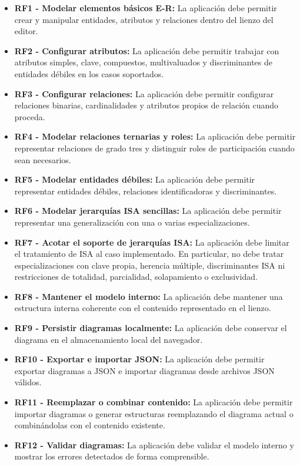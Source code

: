 \begin{itemize}
\tightlist
\item \textbf{RF1 - Modelar elementos básicos E-R:} La aplicación debe permitir crear y manipular entidades, atributos y relaciones dentro del lienzo del editor.
\item \textbf{RF2 - Configurar atributos:} La aplicación debe permitir trabajar con atributos simples, clave, compuestos, multivaluados y discriminantes de entidades débiles en los casos soportados.
\item \textbf{RF3 - Configurar relaciones:} La aplicación debe permitir configurar relaciones binarias, cardinalidades y atributos propios de relación cuando proceda.
\item \textbf{RF4 - Modelar relaciones ternarias y roles:} La aplicación debe permitir representar relaciones de grado tres y distinguir roles de participación cuando sean necesarios.
\item \textbf{RF5 - Modelar entidades débiles:} La aplicación debe permitir representar entidades débiles, relaciones identificadoras y discriminantes.
\item \textbf{RF6 - Modelar jerarquías ISA sencillas:} La aplicación debe permitir representar una generalización con una o varias especializaciones.
\item \textbf{RF7 - Acotar el soporte de jerarquías ISA:} La aplicación debe limitar el tratamiento de ISA al caso implementado. En particular, no debe tratar especializaciones con clave propia, herencia múltiple, discriminantes ISA ni restricciones de totalidad, parcialidad, solapamiento o exclusividad.
\item \textbf{RF8 - Mantener el modelo interno:} La aplicación debe mantener una estructura interna coherente con el contenido representado en el lienzo.
\item \textbf{RF9 - Persistir diagramas localmente:} La aplicación debe conservar el diagrama en el almacenamiento local del navegador.
\item \textbf{RF10 - Exportar e importar JSON:} La aplicación debe permitir exportar diagramas a JSON e importar diagramas desde archivos JSON válidos.
\item \textbf{RF11 - Reemplazar o combinar contenido:} La aplicación debe permitir importar diagramas o generar estructuras reemplazando el diagrama actual o combinándolas con el contenido existente.
\item \textbf{RF12 - Validar diagramas:} La aplicación debe validar el modelo interno y mostrar los errores detectados de forma comprensible.

\end{itemize}
